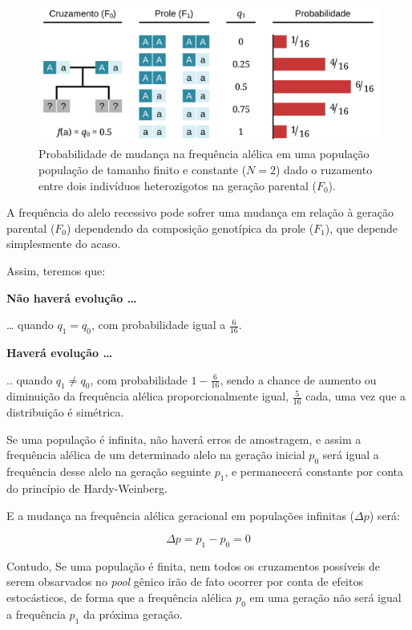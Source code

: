 \documentclass[
]{book}
\begin{document}
\begin{figure}

{\centering \includegraphics[width=800px]{figs/drift_breed_N2} 

}

\caption{Probabilidade de mudança na frequência alélica em uma população população de tamanho finito e constante ($N=2$) dado o ruzamento entre dois indivíduos heterozigotos na geração parental ($F_0$).}\label{fig:driftN2}
\end{figure}

A frequência do alelo recessivo pode sofrer uma mudança em relação à geração parental (\(F_0\)) dependendo da composição genotípica da prole (\(F_1\)), que depende simplesmente do acaso.

Assim, teremos que:

\textbf{Não haverá evolução \ldots{}}

\ldots{} quando \(q_1 = q_0\), com probabilidade igual a \(\frac{6}{16}\).

\textbf{Haverá evolução \ldots{}}

.. quando \(q_1 \ne q_0\), com probabilidade \(1-\frac{6}{16}\), sendo a chance de aumento ou diminuição da frequência alélica proporcionalmente igual, \(\frac{5}{16}\) cada, uma vez que a distribuição é simétrica.

Se uma população é infinita, não haverá erros de amostragem, e assim a frequência alélica de um determinado alelo na geração inicial \(p_0\) será igual a frequência desse alelo na geração seguinte \(p_1\), e permanecerá constante por conta do princípio de Hardy-Weinberg.

E a mudança na frequência alélica geracional em populações infinitas (\(\Delta p\)) será:

\[\Delta p = p_1 - p_0 = 0\]

Contudo, Se uma população é finita, nem todos os cruzamentos possíveis de serem obsarvados no \emph{pool} gênico irão de fato ocorrer por conta de efeitos estocásticos, de forma que a frequência alélica \(p_0\) em uma geração não será igual a frequência \(p_1\) da próxima geração.
\end{document}
